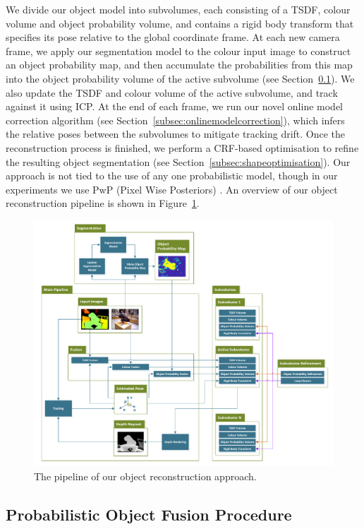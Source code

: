 We divide our object model into subvolumes, each consisting of a TSDF, 
colour volume and object probability volume, and contains a rigid body transform that specifies its pose relative to the global coordinate frame. At each new camera frame, we apply our segmentation model to the colour input image to construct an object probability map, and then accumulate the probabilities from this map into the object probability volume of the active subvolume (see Section~\ref{subsec:probfusion}). We also update the TSDF and colour volume of the active subvolume, and track against it using ICP. At the end of each frame, we run our novel online model correction algorithm (see Section~\ref{subsec:onlinemodelcorrection}), which infers the relative poses between the subvolumes to mitigate tracking drift. Once the reconstruction process is finished, we perform a CRF-based optimisation to refine the resulting object segmentation (see Section~\ref{subsec:shapeoptimisation}). Our approach is not tied to the use of any one probabilistic model, though in our experiments we use PwP (Pixel Wise Posteriors) \cite{Bibby2008}. An overview of our object reconstruction pipeline is shown in Figure~\ref{pipelineDiagram}.

\begin{figure}[!t]
	\centering
	\includegraphics[width=0.7\linewidth]{pipeline.pdf}
	\vspace{-3mm}
	\caption{The pipeline of our object reconstruction approach.}
	\label{pipelineDiagram}
\end{figure}

\subsection{Probabilistic Object Fusion Procedure}
\label{subsec:probfusion}

